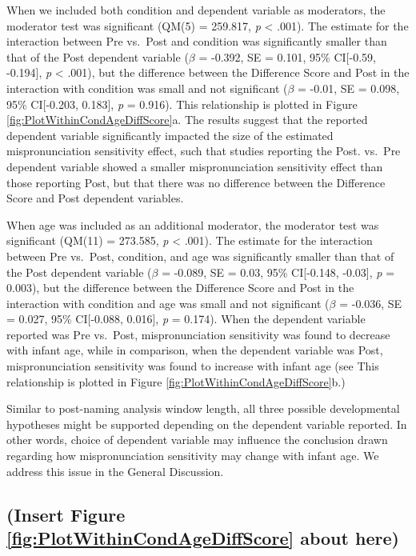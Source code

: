 \documentclass[man]{apa6}
\begin{document}
When we included both condition and dependent variable as moderators, the moderator test was significant (QM(5) = 259.817, \emph{p} \textless{} .001). The estimate for the interaction between Pre vs.~Post and condition was significantly smaller than that of the Post dependent variable (\(\beta\) = -0.392, SE = 0.101, 95\% CI{[}-0.59, -0.194{]}, \emph{p} \textless{} .001), but the difference between the Difference Score and Post in the interaction with condition was small and not significant (\(\beta\) = -0.01, SE = 0.098, 95\% CI{[}-0.203, 0.183{]}, \emph{p} = 0.916). This relationship is plotted in Figure \ref{fig:PlotWithinCondAgeDiffScore}a. The results suggest that the reported dependent variable significantly impacted the size of the estimated mispronunciation sensitivity effect, such that studies reporting the Post. vs.~Pre dependent variable showed a smaller mispronunciation sensitivity effect than those reporting Post, but that there was no difference between the Difference Score and Post dependent variables.

When age was included as an additional moderator, the moderator test was significant (QM(11) = 273.585, \emph{p} \textless{} .001). The estimate for the interaction between Pre vs.~Post, condition, and age was significantly smaller than that of the Post dependent variable (\(\beta\) = -0.089, SE = 0.03, 95\% CI{[}-0.148, -0.03{]}, \emph{p} = 0.003), but the difference between the Difference Score and Post in the interaction with condition and age was small and not significant (\(\beta\) = -0.036, SE = 0.027, 95\% CI{[}-0.088, 0.016{]}, \emph{p} = 0.174). When the dependent variable reported was Pre vs.~Post, mispronunciation sensitivity was found to decrease with infant age, while in comparison, when the dependent variable was Post, mispronunciation sensitivity was found to increase with infant age (see This relationship is plotted in Figure \ref{fig:PlotWithinCondAgeDiffScore}b.)

Similar to post-naming analysis window length, all three possible developmental hypotheses might be supported depending on the dependent variable reported. In other words, choice of dependent variable may influence the conclusion drawn regarding how mispronunciation sensitivity may change with infant age. We address this issue in the General Discussion.

\hypertarget{insert-figure-reffigplotwithincondagediffscore-about-here}{%
\subsection{(Insert Figure \ref{fig:PlotWithinCondAgeDiffScore} about here)}\label{insert-figure-reffigplotwithincondagediffscore-about-here}}
\end{document}
